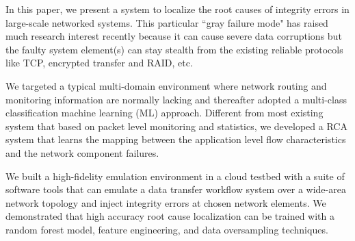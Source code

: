 In this paper, we present a system to localize the root causes of integrity errors in large-scale networked systems. 
This particular ``gray failure mode" has raised much research interest recently 
because it can cause severe data corruptions but the faulty system element(s) 
can stay stealth from the existing reliable protocols like TCP, encrypted transfer and RAID, etc.

We targeted a typical multi-domain environment where network routing 
and monitoring information are normally lacking and thereafter adopted a multi-class classification machine learning (ML) approach. 
Different from most existing system that based on packet level monitoring and statistics,  
we developed a RCA system that learns the mapping between the application level flow characteristics and the network component failures.

We built a high-fidelity emulation environment in a cloud testbed with a suite of software tools that can 
emulate a data transfer workflow system over a wide-area network topology and inject integrity errors at chosen network elements.
We demonstrated that high accuracy root cause localization can be trained with a random forest model, feature engineering, and data oversampling techniques.
